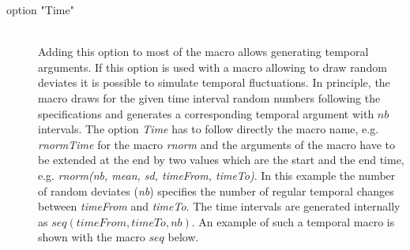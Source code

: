 \documentclass[letterpaper,12pt,oneside]{book}
\begin{document}
\begin{description}
\item[option "Time"]\hspace*{\fill}\\
Adding this option to most of the macro allows generating temporal arguments. If this option is used with a macro allowing to draw random deviates it is possible to simulate temporal fluctuations. In principle, the macro draws for the given time interval random numbers following the specifications and generates a corresponding temporal argument with $nb$ intervals. The option \textit{Time} has to follow directly the macro name, e.g. \textit{rnormTime} for the macro \textit{rnorm} and the arguments of the macro have to be extended at the end by two values which are the start and the end time, e.g. \textit{rnorm(nb, mean, sd, timeFrom, timeTo)}. In this example the number of random deviates (\textit{nb}) specifies the number of regular temporal changes between \textit{timeFrom} and \textit{timeTo}. The time intervals are generated internally as $seq(timeFrom, timeTo, nb)$. An example of such a temporal macro is shown with the macro $seq$ below.


\end{description}
\end{document}
